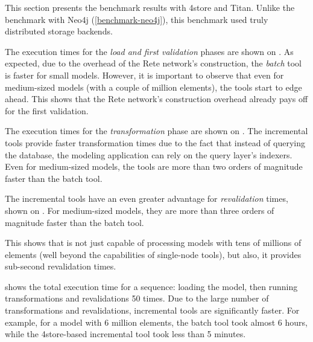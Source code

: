 This section presents the benchmark results with 4store and Titan. Unlike the benchmark with Neo4j (\autoref{benchmark-neo4j}), this benchmark used truly distributed storage backends.



The execution times for the \emph{load and first validation} phases are shown on .
As expected, due to the overhead of the Rete network's construction, the \emph{batch} tool is faster for small models. However, it is important to observe that even for medium-sized models (with a couple of million elements), the \iqd{} tools start to edge ahead. This shows that the Rete network's construction overhead already pays off for the first validation.


The execution times for the \emph{transformation} phase are shown on . The incremental tools provide faster transformation times due to the fact that instead of querying the database, the modeling application can rely on the query layer's indexers. Even for medium-sized models, the \iqd{} tools are more than two orders of magnitude faster than the batch tool.


The incremental tools have an even greater advantage for \emph{revalidation} times, shown on . For medium-sized models, they are more than three orders of magnitude faster than the batch tool.

This shows that \iqd{} is not just capable of processing models with tens of millions of elements (well beyond the capabilities of single-node tools), but also, it provides sub-second revalidation times.


 shows the total execution time for a sequence: loading the model, then running transformations and revalidations 50 times. Due to the large number of transformations and revalidations, incremental tools are significantly faster. For example, for a model with 6 million elements, the batch tool took almost 6 hours, while the 4store-based incremental tool took less than 5 minutes. 

